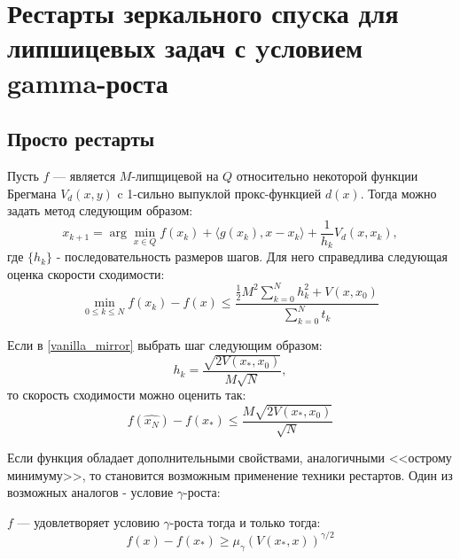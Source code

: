 \chapter{Рестарты зеркального спyска для липшицевых задач с yсловием gamma-роста}\label{ch:ch2}

\section{Просто рестарты}\label{sec:ch3/sect1}

\begin{theorem} \label{vanilla_mirror}
    Пусть $f$ --- является $M$-липщицевой на $Q$ относительно некоторой функции Брегмана $V_d(x, y)$ c 1-сильно выпуклой прокс-функцией $d(x)$. Тогда можно задать метод следующим образом:
    \begin{equation} \label{mirr_upd}
        x_{k+1} = \arg \min_{x \in Q} {f(x_k) + \langle g(x_k), x - x_k \rangle + \frac{1}{h_k} V_d(x, x_k)},
    \end{equation}
    где $\{ h_k \}$ - последовательность размеров шагов.
    Для него справедлива следующая оценка скорости сходимости:
    \begin{equation}
        \min_{0\leq k \leq N} f(x_k) - f(x) \leq \frac{\frac{1}{2} M^2 \sum_{k=0}^N h_k^2 + V(x, x_0)}{\sum_{k=0}^N t_k}
    \end{equation}
\end{theorem}


\begin{remark}
    Если в \ref{vanilla_mirror} выбрать шаг следующим образом:
    \begin{equation} \label{mirr_step}
        h_{k} = \frac{\sqrt{2 V(x_*, x_0)}}{M\sqrt{N}},
    \end{equation}
    то скорость сходимости можно оценить так:
    \begin{equation} \label{mirr_est}
        f(\widehat{x_N}) - f(x_*) \leq \frac{M\sqrt{2V(x_*, x_0)}}{\sqrt{N}}
    \end{equation}
\end{remark}
Если функция обладает дополнительными свойствами, аналогичными <<острому минимуму>>,  то становится возможным применение техники рестартов. Один из возможных аналогов - условие $\gamma$-роста:

\begin{definition} \label{gamma-growth}
   $f$ --- удовлетворяет условию $\gamma$-роста тогда и только тогда:
   \begin{equation}
       f(x) - f(x_*) \geq \mu_{\gamma}(V(x_*,x))^{\gamma/2}
   \end{equation}
\end{definition}

